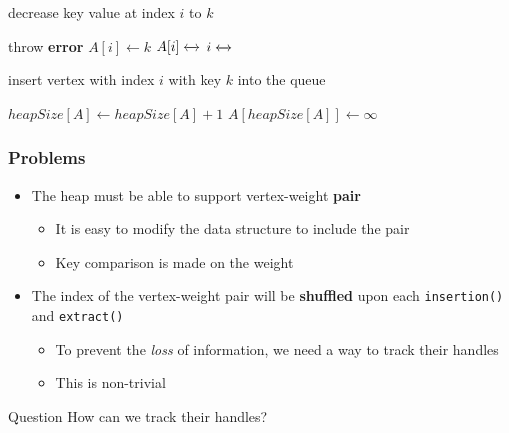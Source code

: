\documentclass{beamer}
\begin{document}
\begin{frame}
	\begin{algorithm}[H]
		\caption{decrease key value at index $i$ to $k$}
		\begin{algorithmic}[1]
			\State throw \textbf{error}  
			\EndIf
			\State \( A[i] \gets k \) 
			\State \( A[i] \xleftrightarrow{} \) 
			\State \( i \xleftrightarrow{} \) 
			\EndWhile
			\EndFunction
		\end{algorithmic}
	\end{algorithm}
\end{frame}

\begin{frame}
	\begin{algorithm}[H]
		\caption{insert vertex with index \( i \) with key \( k \)  into the queue}
		\begin{algorithmic}[1]
			\State \( heapSize[A] \gets heapSize[A]+1 \) 
			\State \( A[heapSize[A]] \gets \infty\) 
			\State {}
			\EndFunction
		\end{algorithmic}
	\end{algorithm}
\end{frame}

\begin{frame}
	\frametitle{Problems}
	\begin{itemize}
		\item The heap must be able to support vertex-weight \textbf{pair} 
		\begin{itemize}
			\item It is easy to modify the data structure to include the pair
			\item Key comparison is made on the weight 
		\end{itemize}
		\item The index of the vertex-weight pair will be \textbf{shuffled} upon each \texttt{insertion()} and \texttt{extract()} 
		\begin{itemize}
			\item To prevent the \emph{loss} of information, we need a way to track their handles
			\item This is non-trivial
		\end{itemize}
	\end{itemize}
	 \begin{block}{Question}
		How can we track their handles?
	\end{block}
\end{frame}
\end{document}

